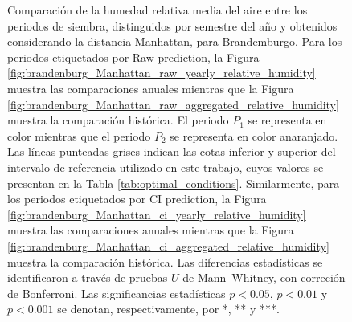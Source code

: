 \begin{figure}[htbp]
	\caption{Comparación de la humedad relativa media del aire entre los periodos de siembra, distinguidos por semestre del año y obtenidos considerando la distancia Manhattan, para Brandemburgo. Para los periodos etiquetados por Raw prediction, la Figura \ref{fig:brandenburg_Manhattan_raw_yearly_relative_humidity} muestra las comparaciones anuales mientras que la Figura \ref{fig:brandenburg_Manhattan_raw_aggregated_relative_humidity} muestra la comparación histórica. El periodo $P_1$ se representa en color mientras que el periodo $P_2$ se representa en color anaranjado. Las líneas punteadas grises indican las cotas inferior y superior del intervalo de referencia utilizado en este trabajo, cuyos valores se presentan en la Tabla \ref{tab:optimal_conditions}. Similarmente, para los periodos etiquetados por CI prediction, la Figura \ref{fig:brandenburg_Manhattan_ci_yearly_relative_humidity} muestra las comparaciones anuales mientras que la Figura \ref{fig:brandenburg_Manhattan_ci_aggregated_relative_humidity} muestra la comparación histórica. Las diferencias estadísticas se identificaron a través de pruebas $U$ de Mann--Whitney, con correción de Bonferroni. Las significancias estadísticas $p<0.05$, $p<0.01$ y $p<0.001$ se denotan, respectivamente, por *, ** y ***.
	}
	\label{fig:brandenburg_Manhattan_relative_humidity}
	
	
\end{figure}





